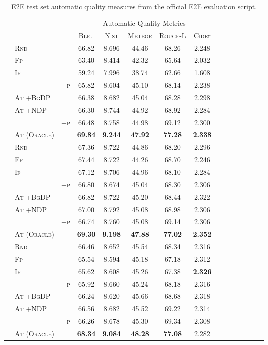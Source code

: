 
\begin{table*}
\centering

\begin{tabular}{lll c c c c  c c c c  c c c c}
 & & &  \multicolumn{5}{c}{Automatic Quality Metrics} \\
 \cmidrule(lr){4-8} 
  & & &  \textsc{Bleu} &  \textsc{Nist} &  \textsc{Meteor} & \textsc{Rouge-L} & \textsc{Cide}r \\
  \midrule
  \parbox[t]{2mm}{}
  &\textsc{Rnd} & &66.82&8.696&44.46&68.26&2.248 \\
  &\textsc{Fp} & &63.40&8.414&42.32&65.64&2.032 \\
  &\textsc{If} & &59.24&7.996&38.74&62.66&1.608 \\
  &  & \textsc{+p}&65.82&8.604&45.10&68.14&2.238 \\
  &\textsc{At +BgDP} & &66.38&8.682&45.04&68.28&2.298 \\
  &\textsc{At +NDP} & &66.30&8.744&44.92&68.92&2.284 \\
  &  & \textsc{+p}&66.48&8.758&44.98&69.12&2.300 \\
  &\textsc{At (Oracle)} & &\textbf{69.84}&\textbf{9.244}&\textbf{47.92}&\textbf{77.28}&\textbf{2.338} \\
  \midrule
  \parbox[t]{2mm}{}
  &\textsc{Rnd} & &67.36&8.722&44.86&68.20&2.296 \\
  &\textsc{Fp} & &67.44&8.722&44.26&68.70&2.246 \\
  &\textsc{If} & &67.12&8.706&44.96&68.10&2.284 \\
  &  & \textsc{+p}&66.80&8.674&45.04&68.30&2.306 \\
  &\textsc{At +BgDP} & &66.82&8.722&45.20&68.44&2.322 \\
  &\textsc{At +NDP} & &67.00&8.792&45.08&68.98&2.306 \\
  &  & \textsc{+p}&66.74&8.760&45.08&69.14&2.306 \\
  &\textsc{At (Oracle)} & &\textbf{69.30}&\textbf{9.198}&\textbf{47.88}&\textbf{77.02}&\textbf{2.352} \\
  \midrule
  \parbox[t]{2mm}{}
  &\textsc{Rnd} & &66.46&8.652&45.54&68.34&2.316 \\
  &\textsc{Fp} & &65.54&8.594&45.18&67.18&2.312 \\
  &\textsc{If} & &65.62&8.608&45.26&67.38&\textbf{2.326} \\
  &  & \textsc{+p}&65.92&8.660&45.24&68.18&2.316 \\
  &\textsc{At +BgDP} & &66.24&8.620&45.66&68.68&2.318 \\
  &\textsc{At +NDP} & &66.56&8.682&45.52&69.22&2.314 \\
  &  & \textsc{+p}&66.26&8.678&45.30&69.34&2.308 \\
  &\textsc{At (Oracle)} & &\textbf{68.34}&\textbf{9.084}&\textbf{48.28}&\textbf{77.08}&2.282 \\
  \midrule
  \end{tabular}



\caption{E2E test set automatic quality measures from the official E2E evaluation script.}
\label{app:e2e.auto}
\end{table*}
